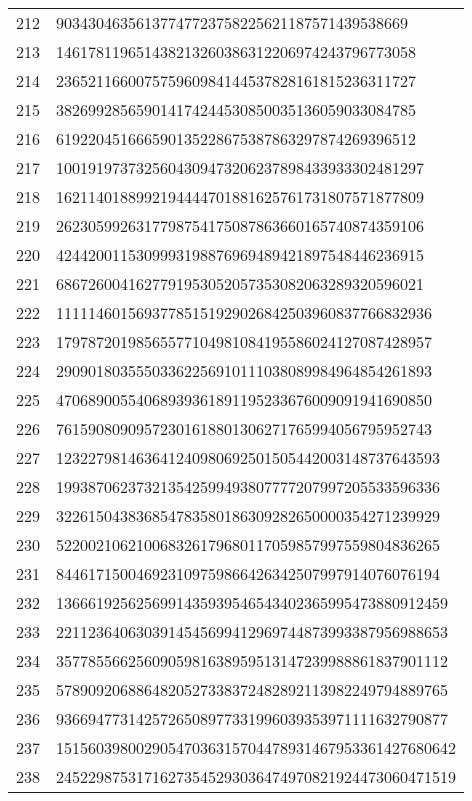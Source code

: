 \documentclass[12pt]{article}
\begin{document}
\begin{tabular}{l|l}
212 & 90343046356137747723758225621187571439538669 \\
213 & 146178119651438213260386312206974243796773058 \\
214 & 236521166007575960984144537828161815236311727 \\
215 & 382699285659014174244530850035136059033084785 \\
216 & 619220451666590135228675387863297874269396512 \\
217 & 1001919737325604309473206237898433933302481297 \\
218 & 1621140188992194444701881625761731807571877809 \\
219 & 2623059926317798754175087863660165740874359106 \\
220 & 4244200115309993198876969489421897548446236915 \\
221 & 6867260041627791953052057353082063289320596021 \\
222 & 11111460156937785151929026842503960837766832936 \\
223 & 17978720198565577104981084195586024127087428957 \\
224 & 29090180355503362256910111038089984964854261893 \\
225 & 47068900554068939361891195233676009091941690850 \\
226 & 76159080909572301618801306271765994056795952743 \\
227 & 123227981463641240980692501505442003148737643593 \\
228 & 199387062373213542599493807777207997205533596336 \\
229 & 322615043836854783580186309282650000354271239929 \\
230 & 522002106210068326179680117059857997559804836265 \\
231 & 844617150046923109759866426342507997914076076194 \\
232 & 1366619256256991435939546543402365995473880912459 \\
233 & 2211236406303914545699412969744873993387956988653 \\
234 & 3577855662560905981638959513147239988861837901112 \\
235 & 5789092068864820527338372482892113982249794889765 \\
236 & 9366947731425726508977331996039353971111632790877 \\
237 & 15156039800290547036315704478931467953361427680642 \\
238 & 24522987531716273545293036474970821924473060471519 \\

\end{tabular}
\end{document}
